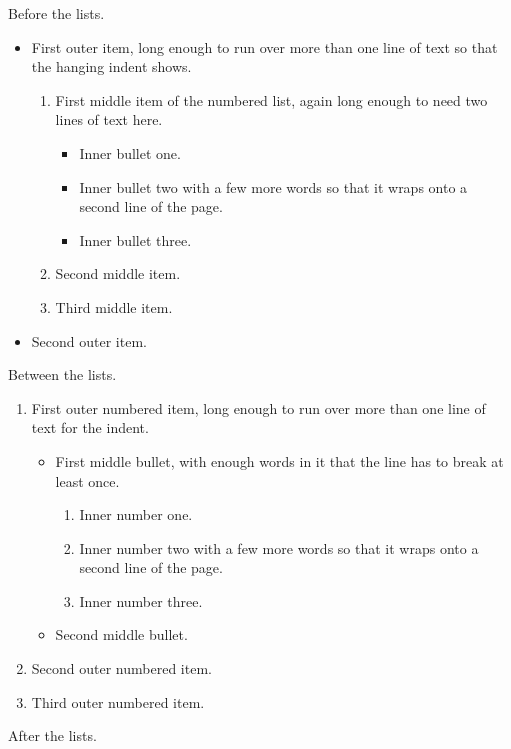 \documentclass{article}
\begin{document}
Before the lists.
\begin{itemize}
\item First outer item, long enough to run over more than one line of text so that the hanging indent shows.
\begin{enumerate}
\item First middle item of the numbered list, again long enough to need two lines of text here.
\begin{itemize}
\item Inner bullet one.
\item Inner bullet two with a few more words so that it wraps onto a second line of the page.
\item Inner bullet three.
\end{itemize}
\item Second middle item.
\item Third middle item.
\end{enumerate}
\item Second outer item.
\end{itemize}
Between the lists.
\begin{enumerate}
\item First outer numbered item, long enough to run over more than one line of text for the indent.
\begin{itemize}
\item First middle bullet, with enough words in it that the line has to break at least once.
\begin{enumerate}
\item Inner number one.
\item Inner number two with a few more words so that it wraps onto a second line of the page.
\item Inner number three.
\end{enumerate}
\item Second middle bullet.
\end{itemize}
\item Second outer numbered item.
\item Third outer numbered item.
\end{enumerate}
After the lists.
\end{document}

